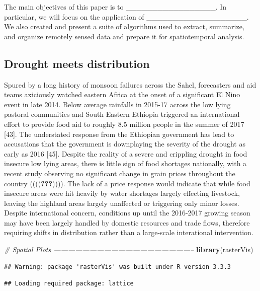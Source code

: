 \documentclass[]{elsarticle} %
\newenvironment{Shaded}{\begin{snugshade}}{\end{snugshade}}
\newcommand{\KeywordTok}[1]{\textcolor[rgb]{0.13,0.29,0.53}{\textbf{{#1}}}}
\newcommand{\CommentTok}[1]{\textcolor[rgb]{0.56,0.35,0.01}{\textit{{#1}}}}
\newcommand{\NormalTok}[1]{{#1}}
\begin{document}
The main objectives of this paper is to
\_\_\_\_\_\_\_\_\_\_\_\_\_\_\_\_\_. In particular, we will focus on the
application of \_\_\_\_\_\_\_\_\_\_\_\_\_\_\_\_\_\_\_. We also created
and present a suite of algorithms used to extract, summarize, and
organize remotely sensed data and prepare it for spatiotemporal
analysis.

\subsection{Drought meets
distribution}\label{drought-meets-distribution}

Spured by a long history of monsoon failures across the Sahel,
forecasters and aid teams axiciously watched eastern Africa at the onset
of a significant El Nino event in late 2014. Below average rainfalls in
2015-17 across the low lying pastoral communities and South Eastern
Ethiopia triggered an international effort to provide food aid to
roughly 8.5 million people in the summer of 2017 {[}43{]}. The
understated response from the Ethiopian government has lead to
accusations that the government is downplaying the severity of the
drought as early as 2016 {[}45{]}. Despite the reality of a severe and
crippling drought in food insecure low lying areas, there is little sign
of food shortages nationally, with a recent study observing no
significant change in grain prices throughout the country
((((\textbf{???})))). The lack of a price response would indicate that
while food insecure areas were hit heavily by water shortages largely
effecting livestock, leaving the highland areas largely unaffected or
triggering only minor losses. Despite international concern, conditions
up until the 2016-2017 growing season may have been largely handled by
domestic resources and trade flows, therefore requiring shifts in
distribution rather than a large-scale interational intervention.

\begin{Shaded}
\begin{Highlighting}[]
\CommentTok{# Spatial Plots -----------------------------------------------------------}
\KeywordTok{library}\NormalTok{(rasterVis)}
\end{Highlighting}
\end{Shaded}

\begin{verbatim}
## Warning: package 'rasterVis' was built under R version 3.3.3
\end{verbatim}

\begin{verbatim}
## Loading required package: lattice
\end{verbatim}
\end{document}
